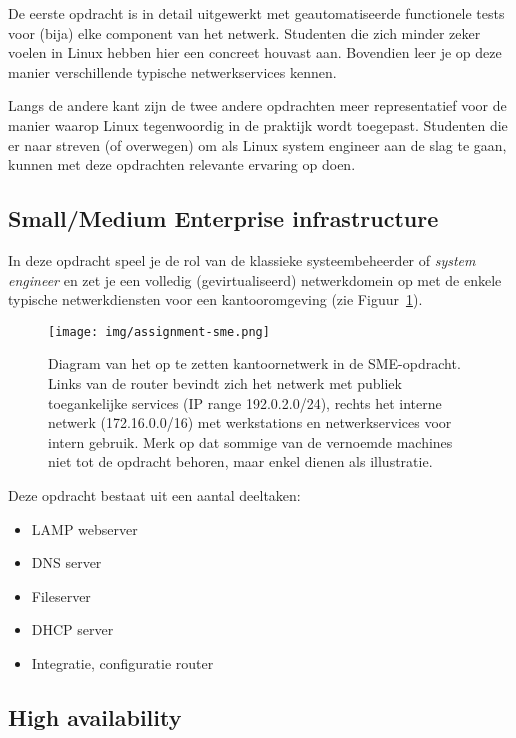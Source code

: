 De eerste opdracht is in detail uitgewerkt met geautomatiseerde functionele tests voor (bija) elke component van het netwerk. Studenten die zich minder zeker voelen in Linux hebben hier een concreet houvast aan. Bovendien leer je op deze manier verschillende typische netwerkservices kennen.

Langs de andere kant zijn de twee andere opdrachten meer representatief voor de manier waarop Linux tegenwoordig in de praktijk wordt toegepast. Studenten die er naar streven (of overwegen) om als Linux system engineer aan de slag te gaan, kunnen met deze opdrachten relevante ervaring op doen.

\subsection{Small/Medium Enterprise infrastructure}%
\label{subs:smallmedium-enterprise-infrastructure}

In deze opdracht speel je de rol van de klassieke systeembeheerder of \textit{system engineer} en zet je een volledig (gevirtualiseerd) netwerkdomein op met de enkele typische netwerkdiensten voor een kantooromgeving (zie Figuur~\ref{fig:sme}).

\begin{figure}
  \centering
  \texttt{[image: img/assignment-sme.png]}
  \caption[Netwerkdiagram SME-opdracht]{Diagram van het op te zetten kantoornetwerk in de SME-opdracht. Links van de router bevindt zich het netwerk met publiek toegankelijke services (IP range 192.0.2.0/24), rechts het interne netwerk (172.16.0.0/16) met werkstations en netwerkservices voor intern gebruik. Merk op dat sommige van de vernoemde machines niet tot de opdracht behoren, maar enkel dienen als illustratie.}%
  \label{fig:sme}
\end{figure}

Deze opdracht bestaat uit een aantal deeltaken:

\begin{itemize}
\item LAMP webserver
\item DNS server
\item Fileserver
\item DHCP server
\item Integratie, configuratie router
\end{itemize}

\subsection{High availability}%
\label{subs:high-availability}

